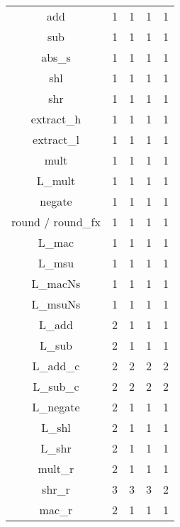 \begin{longtable}{|c|c|c|c|c|}
add                     & 1       & 1       & 1       & 1        \\
sub                     & 1       & 1       & 1       & 1        \\
abs\_s                  & 1       & 1       & 1       & 1        \\
shl                     & 1       & 1       & 1       & 1        \\
shr                     & 1       & 1       & 1       & 1        \\
extract\_h              & 1       & 1       & 1       & 1        \\
extract\_l              & 1       & 1       & 1       & 1        \\
mult                    & 1       & 1       & 1       & 1        \\
L\_mult                 & 1       & 1       & 1       & 1        \\
negate                  & 1       & 1       & 1       & 1        \\
round / round\_fx       & 1       & 1       & 1       & 1        \\
L\_mac                  & 1       & 1       & 1       & 1        \\
L\_msu                  & 1       & 1       & 1       & 1        \\
L\_macNs                & 1       & 1       & 1       & 1        \\
L\_msuNs                & 1       & 1       & 1       & 1        \\
L\_add                  & 2       & 1       & 1       & 1        \\
L\_sub                  & 2       & 1       & 1       & 1        \\
L\_add\_c               & 2       & 2       & 2       & 2        \\
L\_sub\_c               & 2       & 2       & 2       & 2        \\
L\_negate               & 2       & 1       & 1       & 1        \\
L\_shl                  & 2       & 1       & 1       & 1        \\
L\_shr                  & 2       & 1       & 1       & 1        \\
mult\_r                 & 2       & 1       & 1       & 1        \\
shr\_r                  & 3       & 3       & 3       & 2        \\
mac\_r                  & 2       & 1       & 1       & 1        \\

\end{longtable}
